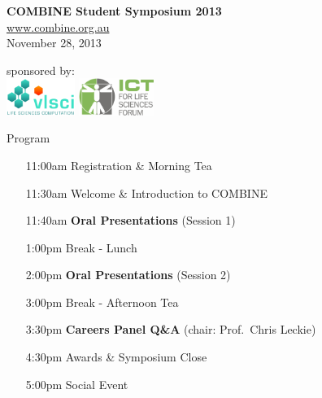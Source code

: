 \documentclass[svgnames]{beamer}
\newcommand{\bp}[1]{{\usebeamercolor[fg]{title}#1}}
\begin{document}
\begin{frame}
    \centering
    \vfill
    {\LARGE \bp{\bfseries COMBINE Student Symposium 2013}}\\[1ex]
    \href{http://www.combine.org.au}{\bp{www.combine.org.au}}\\[2ex]
    {November 28, 2013}\\
    \vfill
    \begin{minipage}[c]{\linewidth}
        \centering
        sponsored by:\\
        \includegraphics[height=12mm,valign=T]{./images/logo_vlsci_3508x1890.jpg}
        \qquad
        \includegraphics[height=12mm,valign=T]{./images/ICT-for-Life-Sciences-Forum-logo.png}
    \end{minipage}
\end{frame}

\begin{frame}{Program}
    \centering
    \begin{minipage}[c]{0.8\linewidth}
        \begin{itemize}
            \item[11:00am] Registration \& Morning Tea
            \item[11:30am] Welcome \& Introduction to COMBINE
            \item[11:40am] \textbf{Oral Presentations} (Session 1)
            \item[1:00pm] Break - Lunch
            \item[2:00pm] \textbf{Oral Presentations} (Session 2)
            \item[3:00pm] Break - Afternoon Tea
            \item[3:30pm] \textbf{Careers Panel Q\&A} (chair: Prof.~Chris Leckie)
            \item[4:30pm] Awards \& Symposium Close
            \item[5:00pm] Social Event
        \end{itemize}
    \end{minipage}
\end{frame}
\end{document}
